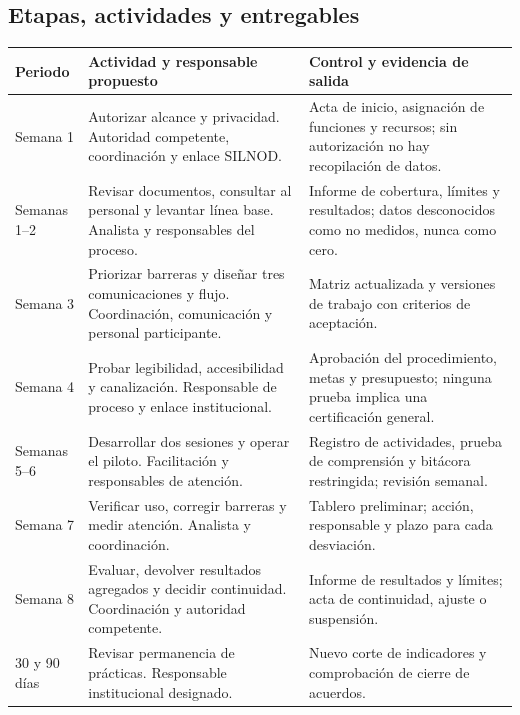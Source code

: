 \documentclass[12pt,letterpaper,oneside]{article}
\begin{document}
\subsection{Etapas, actividades y entregables}
\begin{longtable}{@{}L{.13\textwidth}L{.39\textwidth}L{.41\textwidth}@{}}
\toprule \textbf{Periodo} & \textbf{Actividad y responsable propuesto} & \textbf{Control y evidencia de salida} \\
\midrule\endhead
Semana 1 & Autorizar alcance y privacidad. Autoridad competente, coordinación y enlace SILNOD. & Acta de inicio, asignación de funciones y recursos; sin autorización no hay recopilación de datos. \\
Semanas 1--2 & Revisar documentos, consultar al personal y levantar línea base. Analista y responsables del proceso. & Informe de cobertura, límites y resultados; datos desconocidos como no medidos, nunca como cero. \\
Semana 3 & Priorizar barreras y diseñar tres comunicaciones y flujo. Coordinación, comunicación y personal participante. & Matriz actualizada y versiones de trabajo con criterios de aceptación. \\
Semana 4 & Probar legibilidad, accesibilidad y canalización. Responsable de proceso y enlace institucional. & Aprobación del procedimiento, metas y presupuesto; ninguna prueba implica una certificación general. \\
Semanas 5--6 & Desarrollar dos sesiones y operar el piloto. Facilitación y responsables de atención. & Registro de actividades, prueba de comprensión y bitácora restringida; revisión semanal. \\
Semana 7 & Verificar uso, corregir barreras y medir atención. Analista y coordinación. & Tablero preliminar; acción, responsable y plazo para cada desviación. \\
Semana 8 & Evaluar, devolver resultados agregados y decidir continuidad. Coordinación y autoridad competente. & Informe de resultados y límites; acta de continuidad, ajuste o suspensión. \\
30 y 90 días & Revisar permanencia de prácticas. Responsable institucional designado. & Nuevo corte de indicadores y comprobación de cierre de acuerdos. \\
\bottomrule
\end{longtable}
\end{document}
